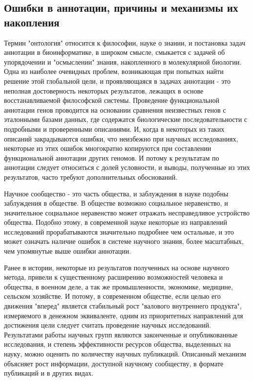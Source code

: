 \subsection{Ошибки в аннотации, причины и механизмы их накопления} \label{sect_annotationbiases}

Термин "онтология" относится к философии, науке о знании, и постановка задач аннотации в биоинформатике, в широком смысле, смыкается с задачей об упорядочении и "осмыслении" знания, накопленного в молекулярной биологии. Одна из наиболее очевидных проблем, возникающая при попытках найти решение этой глобальной цели, и проявляющаяся в задачах аннотации - это неполная достоверность некоторых результатов, лежащих в основе восстанавливаемой философской системы. Проведение функциональной аннотации генов проводится на основании сравнения неизвестных генов с эталонными базами данных, где содержатся биологические последовательности с подробными и проверенными описаниями. И, когда в некоторых из таких описаний закрадываются ошибки, что неизбежно при научных исследованиях, некоторые из этих ошибок многократно копируются при составлении функциональной аннотации других геномов. И потому к результатам по аннотации следует относиться с долей условности, и выводы, полученные из этих результатов, часто требуют дополнительных обоснований.

Научное сообщество - это часть общества, и заблуждения в науке подобны заблуждения в обществе. В обществе возможно социальное неравенство, и значительное социальное неравенство может отражать несправедливое устройство общества. Подобно этому, в современной науке некоторые из направлений исследований прорабатываются значительно подробнее чем остальные, и это может означать наличие ошибок в системе научного знания, более масштабных, чем упомянутые выше ошибки аннотации.

Ранее в истории, некоторые из результатов полученных на основе научного метода, привели к существенному расширению возможностей человека и общества, в военном деле, а так же промышленности, экономике, медицине, сельском хозяйстве. И потому, в современном обществе, если целью его движения "вперед" является стабильный рост "валового внутреннего продукта", измеряемого в денежном эквиваленте, одним из приоритетных направлений для достижения цели следует считать проведение научных исследований. Результатами работы научных групп являются законченные и опубликованные исследования, и степень эффективности ресурсов общества, выделенных на науку, можно оценить по количеству научных публикаций. Описанный механизм объясняет рост информации, доступной научному сообществу, в формате публикаций и в других видах.

